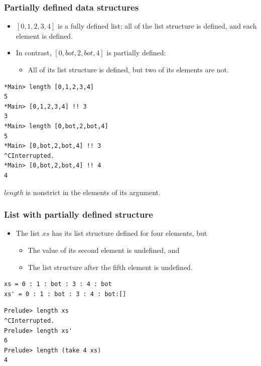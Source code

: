 \documentclass{beamer}
\begin{document}
\begin{frame}[fragile]
\frametitle{Partially defined data structures}

\begin{itemize}
\item $[0,1,2,3,4]$ is a fully defined list: all of the list
  structure is defined, and each element is defined.
\item In contrast, $[0,bot,2,bot,4]$ is partially defined:
  \begin{itemize}
  \item All of its list structure is defined, but two of its
    elements are not.
  \end{itemize}
\end{itemize}

\begin{verbatim}
*Main> length [0,1,2,3,4]
5
*Main> [0,1,2,3,4] !! 3
3
*Main> length [0,bot,2,bot,4]
5
*Main> [0,bot,2,bot,4] !! 3
^CInterrupted.
*Main> [0,bot,2,bot,4] !! 4
4
\end{verbatim}

$length$ is nonstrict in the elements of its argument.

\end{frame}

\begin{frame}[fragile]
\frametitle{List with partially defined structure}

\begin{itemize}
\item The list $xs$ has its list structure defined for four
  elements, but
  \begin{itemize}
  \item The value of its second element is undefined, and
  \item The list structure after the fifth element is undefined.
  \end{itemize}
\end{itemize}
{\small
\begin{verbatim}
xs = 0 : 1 : bot : 3 : 4 : bot
xs' = 0 : 1 : bot : 3 : 4 : bot:[]
\end{verbatim}


\begin{verbatim}
Prelude> length xs
^CInterrupted.
Prelude> length xs'
6
Prelude> length (take 4 xs)
4
\end{verbatim}
}
\end{frame}
\end{document}
